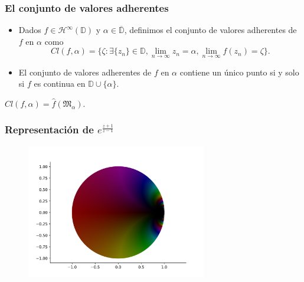\documentclass[spanish, a4paper, 12pt, final, slideColor, nototal, colorBG, pdf, noaccumulate, darkblue]{beamer}
\providecommand{\bholomorphic}[1]{\mathcal{H}^{\infty}(#1)}
\newcommand{\disk}{\mathbb{D}}
\newcommand{\closedisk}{\overline{\disk}}
\newcommand{\fiber}{\mathfrak{M}}
\begin{document}
\begin{frame}
    \frametitle{El conjunto de valores adherentes}
    \begin{itemize}
        \item  Dados $f \in \bholomorphic{\disk}$ y $\alpha \in \closedisk$, definimos el conjunto de valores adherentes de $f$ en $\alpha$ como
            \begin{equation*}
                Cl(f, \alpha) = \{\zeta : \exists \{z_n\} \in \disk, \lim_{n \to \infty} z_n = \alpha, \lim_{n \to \infty} f(z_n) = \zeta \}.
            \end{equation*}

        \item El conjunto de valores adherentes de $f$ en $\alpha$ contiene un único punto si y solo si $f$ es continua en $\disk \cup \{\alpha\}$.
    \end{itemize}

    \begin{block}{} \centering
         $Cl(f, \alpha) = \widehat{f}(\fiber_\alpha)$.
    \end{block}
\end{frame}

\begin{frame}
    \frametitle{Representación de $e^{\frac{z+1}{z-1}}$}
    \begin{figure}[!htbp]
        \centering
        \includegraphics[width=0.7\textwidth]{../Aplicacion/e^((z+1):(z-1)).png}
        \label{fig:e^((z+1)/(z-1))}
    \end{figure}
\end{frame}

\end{document}
